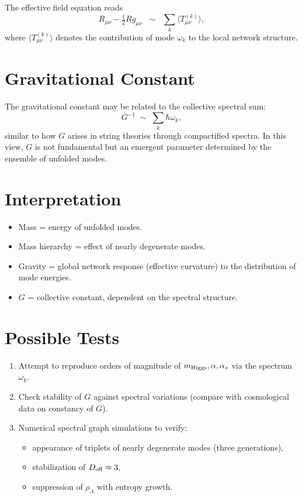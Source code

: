 \documentclass[12pt,a4paper]{article}
\begin{document}
The effective field equation reads
\[
R_{\mu\nu} - \tfrac{1}{2} R g_{\mu\nu} \;\;\sim\;\; 
\sum_{k} \langle T_{\mu\nu}^{(k)} \rangle ,
\]
where $\langle T_{\mu\nu}^{(k)} \rangle$ denotes the contribution of mode $\omega_k$ to the local network structure.

\section{Gravitational Constant}
The gravitational constant may be related to the collective spectral sum:
\[
G^{-1} \;\sim\; \sum_{k} \hbar \omega_k ,
\]
similar to how $G$ arises in string theories through compactified spectra. In this view, $G$ is not fundamental but an emergent parameter determined by the ensemble of unfolded modes.

\section{Interpretation}
\begin{itemize}
  \item Mass = energy of unfolded modes.
  \item Mass hierarchy = effect of nearly degenerate modes.
  \item Gravity = global network response (effective curvature) to the distribution of mode energies.
  \item $G$ = collective constant, dependent on the spectral structure.
\end{itemize}

\section{Possible Tests}
\begin{enumerate}
  \item Attempt to reproduce orders of magnitude of $m_{\rm Higgs}, \alpha, \alpha_s$ via the spectrum $\omega_k$.
  \item Check stability of $G$ against spectral variations (compare with cosmological data on constancy of $G$).
  \item Numerical spectral graph simulations to verify:
  \begin{itemize}
    \item appearance of triplets of nearly degenerate modes (three generations),
    \item stabilization of $D_{\rm eff}\approx 3$,
    \item suppression of $\rho_\Lambda$ with entropy growth.
  \end{itemize}
\end{enumerate}
\end{document}
